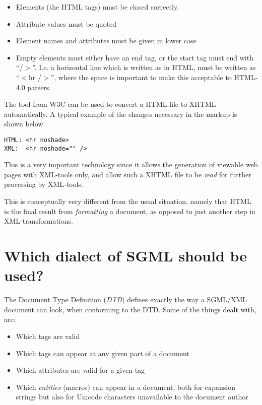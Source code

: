 \begin{itemize}
\item Elements (the HTML tags) must be closed correctly.
  
\item Attribute values must be quoted
\item Element names and attributes must be given in lower case
  
\item Empty elements must either have an end tag, or the start tag
  must end with ``/$>$''.  I.e. a horizontal line which is written as
   in HTML, must be written as
  ``$<$hr /$>$'', where the space is important to make this acceptable
  to HTML-4.0 parsers.
\end{itemize}

The  tool from W3C can be used to
convert a HTML-file to XHTML automatically.  A typical example of the
changes necessary in the markup is shown below.

\begin{verbatim}
HTML: <hr noshade>
XML:  <hr noshade="" />
\end{verbatim}

This is a very important technology since it allows the generation of
viewable web pages with XML-tools only, and allow such a XHTML file to
be \textit{read} for further processing by XML-tools.

This is conceptually very different from the usual situation, namely
that HTML is the final result from \textit{formatting} a document, as
opposed to just another step in XML-transformations.




\section{Which dialect of SGML should be used?}

The Document Type Definition (\emph{DTD}) defines exactly the way a
SGML/XML document can look, when conforming to the DTD.  Some of the
things dealt with, are:

\begin{itemize}
\item Which tags are valid
\item Which tags can appear at any given part of a document
\item Which attributes are valid for a given tag
\item Which \emph{entities} (macros) can appear in a document, both
for expansion strings but also for Unicode characters unavailable to
the document author
\end{itemize}

